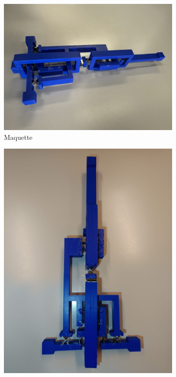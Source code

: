\documentclass[a4paper, 11pt]{article} %
\begin{document}
\begin{figure}[H]
    \centering
    
    \begin{subfigure}[b]{0.45\linewidth}
        \centering
        \includegraphics[width=\linewidth]{images/IMG_2560.jpeg}
        \caption{Maquette}
        \label{fig:maquette1}
    \end{subfigure}
    \hfill
    \begin{subfigure}[b]{0.45\linewidth}
        \centering
        \includegraphics[width=\linewidth]{images/maquette.jpg}

\end{subfigure}
\end{figure}
\end{document}
